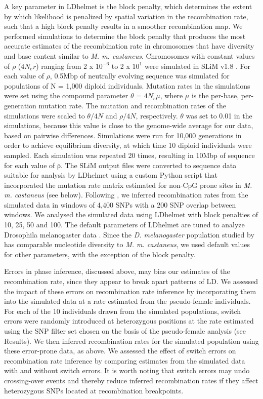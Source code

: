 	A key parameter in LDhelmet is the block penalty, which determines the extent by which likelihood is penalized by spatial variation in the recombination rate, such that a high block penalty results in a smoother recombination map. We performed simulations to determine the block penalty that produces the most accurate estimates of the recombination rate in chromosomes that have diversity and base content similar to \textit{M. m. castaneus}. Chromosomes with constant values of $\rho$ ($4N_er$) ranging from 2 x $10^{-6}$ to 2 x $10^1$ were simulated in SLiM v1.8 \citep{RN148}. For each value of $\rho$, 0.5Mbp of neutrally evolving sequence was simulated for populations of N = 1,000 diploid individuals. Mutation rates in the simulations were set using the compound parameter $\theta$ = $4N_e\mu$, where $\mu$ is the per-base, per-generation mutation rate. The mutation and recombination rates of the simulations were scaled to $\theta /4N$ and $\rho /4N$, respectively. $\theta$ was set to 0.01 in the simulations, because this value is close to the genome-wide average for our data, based on pairwise differences. Simulations were run for 10,000 generations in order to achieve equilibrium diversity, at which time 10 diploid individuals were sampled. Each simulation was repeated 20 times, resulting in 10Mbp of sequence for each value of ρ. The SLiM output files were converted to sequence data suitable for analysis by LDhelmet using a custom Python script that incorporated the mutation rate matrix estimated for non-CpG prone sites in \textit{M. m. castaneus} (see below). Following \cite{RN213}, we inferred recombination rates from the simulated data in windows of 4,400 SNPs with a 200 SNP overlap between windows. We analysed the simulated data using LDhelmet with block penalties of 10, 25, 50 and 100. The default parameters of LDhelmet are tuned to analyze Drosophila melanogaster data \citep{RN213}. Since the \textit{D. melanogaster} population studied by \cite{RN213} has comparable nucleotide diversity to \textit{M. m. castaneus}, we used default values for other parameters, with the exception of the block penalty.
 
	Errors in phase inference, discussed above, may bias our estimates of the recombination rate, since they appear to break apart patterns of LD. We assessed the impact of these errors on recombination rate inference by incorporating them into the simulated data at a rate estimated from the pseudo-female individuals. For each of the 10 individuals drawn from the simulated populations, switch errors were randomly introduced at heterozygous positions at the rate estimated using the SNP filter set chosen on the basis of the pseudo-female analysis (see Results). We then inferred recombination rates for the simulated population using these error-prone data, as above. We assessed the effect of switch errors on recombination rate inference by comparing estimates from the simulated data with and without switch errors. It is worth noting that switch errors may undo crossing-over events and thereby reduce inferred recombination rates if they affect heterozygous SNPs located at recombination breakpoints.

